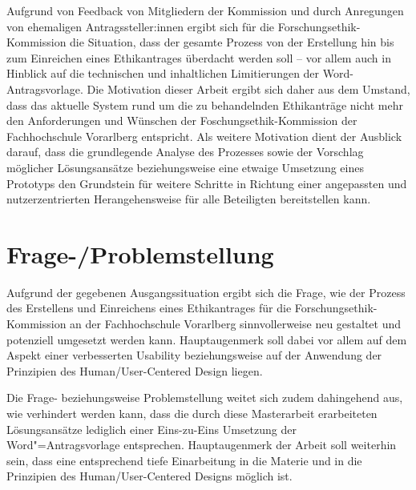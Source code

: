 \documentclass[a4paper,12pt,twoside]{scrreprt}
\begin{document}
\medskip

Aufgrund von Feedback von Mitgliedern der Kommission und durch Anregungen von ehemaligen Antragssteller:innen ergibt sich für die Forschungsethik-Kommission die Situation, dass der gesamte Prozess von der Erstellung hin bis zum Einreichen eines Ethikantrages überdacht werden soll -- vor allem auch in Hinblick auf die technischen und inhaltlichen Limitierungen der Word-Antragsvorlage. Die Motivation dieser Arbeit ergibt sich daher aus dem Umstand, dass das aktuelle System rund um die zu behandelnden Ethikanträge nicht mehr den Anforderungen und Wünschen der Foschungsethik-Kommission der Fachhochschule Vorarlberg entspricht. Als weitere Motivation dient der Ausblick darauf, dass die grundlegende Analyse des Prozesses sowie der Vorschlag möglicher Lösungsansätze beziehungsweise eine etwaige Umsetzung eines Prototyps den Grundstein für weitere Schritte in Richtung einer angepassten und nutzerzentrierten Herangehensweise für alle Beteiligten bereitstellen kann. 

\section{Frage-/Problemstellung}
\label{sec:frage-problemstellung}

Aufgrund der gegebenen Ausgangssituation ergibt sich die Frage, wie der Prozess des Erstellens und Einreichens eines Ethikantrages für die Forschungsethik-Kommission an der Fachhochschule Vorarlberg sinnvollerweise neu gestaltet und potenziell umgesetzt werden kann. Hauptaugenmerk soll dabei vor allem auf dem Aspekt einer verbesserten Usability beziehungsweise auf der Anwendung der Prinzipien des Human/User-Centered Design liegen.

Die Frage- beziehungsweise Problemstellung weitet sich zudem dahingehend aus, wie verhindert werden kann, dass die durch diese Masterarbeit erarbeiteten Lösungsansätze lediglich einer Eins-zu-Eins Umsetzung der Word"=Antragsvorlage entsprechen. Hauptaugenmerk der Arbeit soll weiterhin sein, dass eine entsprechend tiefe Einarbeitung in die Materie und in die Prinzipien des Human/User-Centered Designs möglich ist.

\medskip
\end{document}

